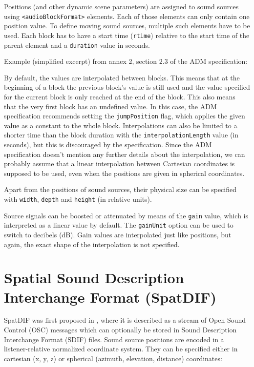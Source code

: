 Positions (and other dynamic scene parameters)
are assigned to sound sources using \texttt{<audioBlockFormat>} elements.
Each of those elements can only contain one position value.
To define moving sound sources, multiple such elements have to be used.
Each block has to have a start time (\texttt{rtime})
relative to the start time of the parent element
and a \texttt{duration} value in seconds.

Example (simplified excerpt) from annex 2,
section 2.3 of the ADM specification:


\noindent
By default,
the values are interpolated between blocks.
This means that at the beginning of a block
the previous block's value is still used
and the value specified for the current block
is only reached at the end of the block.
This also means that the very first block
has an undefined value.
In this case, the ADM specification recommends
setting the \texttt{jumpPosition} flag,
which applies the given value as a constant to the whole block.
Interpolations can also be limited to a shorter time than the block duration
with the \texttt{interpolationLength} value (in seconds),
but this is discouraged by the specification.
Since the ADM specification doesn't mention any further details
about the interpolation,
we can probably assume that a linear interpolation between Cartesian coordinates
is supposed to be used,
even when the positions are given in spherical coordinates.

Apart from the positions of sound sources,
their physical size can be specified with
\texttt{width},
\texttt{depth} and
\texttt{height} (in relative units).

Source signals can be boosted or attenuated by means of the
\texttt{gain} value, which is interpreted as a linear value by default.
The \texttt{gainUnit} option can be used to switch to decibels (dB).
Gain values are interpolated just like positions,
but again, the exact shape of the interpolation is not specified.


\section{Spatial Sound Description Interchange Format (SpatDIF)}
\label{sec:SpatDIF}

SpatDIF was first proposed in
\parencite{peters2007spatdif},
where it is described as a stream of
Open Sound Control (OSC)
messages which can optionally be stored in
Sound Description Interchange Format (SDIF)
files.
Sound source positions are encoded in a
listener-relative normalized coordinate system.
They can be specified either in cartesian (x, y, z)
or spherical (azimuth, elevation, distance) coordinates:


